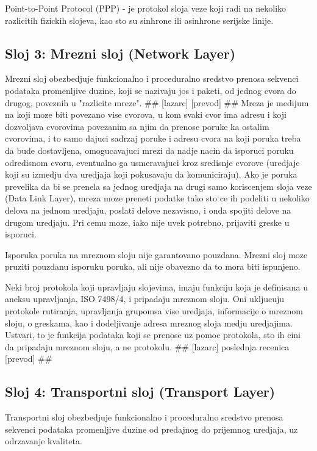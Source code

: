 \documentclass[a4paper,12pt, master]{etf}
\begin{document}
	Point-to-Point Protocol (PPP) - je protokol sloja veze koji radi na nekoliko razlicitih
	fizickih slojeva, kao sto su sinhrone ili asinhrone serijske linije.

	\subsection{Sloj 3: Mrezni sloj (Network Layer)}

	Mrezni sloj obezbedjuje funkcionalno i proceduralno sredstvo prenosa sekvenci podataka
	promenljive duzine, koji se nazivaju jos i paketi, od jednog cvora do drugog, poveznih u
	"razlicite mreze". \#\# [lazarc] [prevod] \#\# Mreza je medijum na koji moze biti povezano 
	vise cvorova, u kom svaki cvor ima adresu i koji dozvoljava cvorovima povezanim sa njim da 
	prenose poruke ka ostalim cvorovima, i to samo dajuci sadrzaj poruke i adresu cvora na 
	koji poruka treba da bude dostavljena, omogucavajuci mrezi da nadje nacin da isporuci 
	poruku odredisnom cvoru, eventualno ga usmeravajuci kroz sredisnje cvorove (uredjaje koji 
	su izmedju dva uredjaja koji pokusavaju da komuniciraju). Ako je poruka prevelika da bi se 
	prenela sa jednog uredjaja na drugi samo koriscenjem sloja veze (Data Link Layer), mreza 
	moze preneti podatke tako sto ce ih podeliti u nekoliko delova na jednom uredjaju, poslati 
	delove nezavisno, i onda spojiti delove na drugom uredjaju. Pri cemu moze, iako nije uvek 
	potrebno, prijaviti greske u isporuci.

	Isporuka poruka na mreznom sloju nije garantovano pouzdana. Mrezni sloj moze pruziti 
	pouzdanu isporuku poruka, ali nije obavezno da to mora biti ispunjeno.

	Neki broj protokola koji upravljaju slojevima, imaju funkciju koja je definisana u aneksu
	upravljanja, ISO 7498/4, i pripadaju mreznom sloju. Oni ukljucuju protokole rutiranja,
	upravljanja grupomsa vise uredjaja, informacije o mreznom sloju, o greskama, kao i 
	dodeljivanje adresa mreznog sloja medju uredjajima. Ustvari, to je funkcija podataka koji 
	se prenose uz pomoc protokola, sto ih cini da pripadaju mreznom sloju, a ne protokolu. 
	\#\# [lazarc] poslednja	recenica [prevod] \#\#

	\subsection{Sloj 4: Transportni sloj (Transport Layer)}

	Transportni sloj obezbedjuje funkcionalno i proceduralno sredstvo prenosa sekvenci podataka
	promenljive duzine od predajnog do prijemnog uredjaja, uz odrzavanje kvaliteta.
\end{document}
